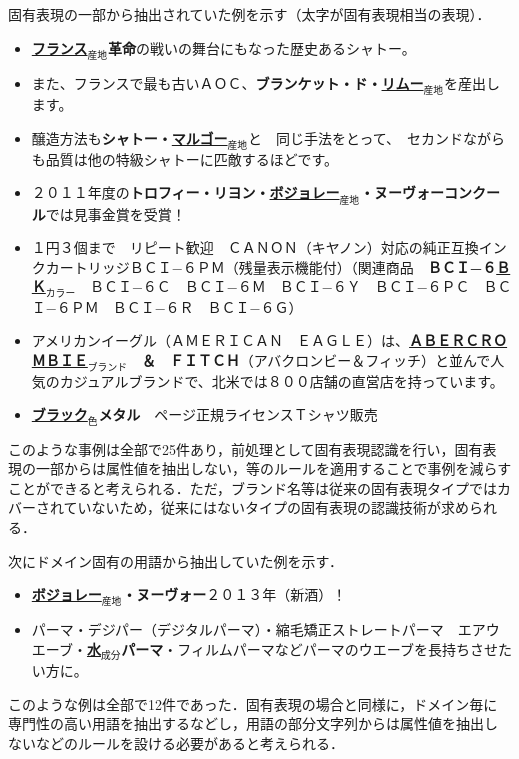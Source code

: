 \documentclass[japanese]{jnlp_1.4}
\begin{document}
固有表現の一部から抽出されていた例を示す（太字が固有表現相当の表現）．

\begin{itemize}
\item {\bf \underline{フランス}$_{産地}$革命}の戦いの舞台にもなった歴史あるシャトー。
\item また、フランスで最も古いＡＯＣ、{\bf ブランケット・ド・\underline{リムー}}$_{産地}$を産出します。
\item 醸造方法も{\bf シャトー・\underline{マルゴー}$_{産地}$}と　同じ手法をとって、　セカンドながらも品質は他の特級シャトーに匹敵するほどです。
\item ２０１１年度の{\bf トロフィー・リヨン・\underline{ボジョレー}$_{産地}$・ヌーヴォーコンクール}では見事金賞を受賞！
\item １円３個まで　リピート歓迎　ＣＡＮＯＮ（キヤノン）対応の純正互換インクカートリッジＢＣＩ−６ＰＭ（残量表示機能付）（関連商品　{\bf ＢＣＩ−６\underline{ＢＫ}$_{カラー}$}　ＢＣＩ−６Ｃ　ＢＣＩ−６Ｍ　ＢＣＩ−６Ｙ　ＢＣＩ−６ＰＣ　ＢＣＩ−６ＰＭ　ＢＣＩ−６Ｒ　ＢＣＩ−６Ｇ）
\item アメリカンイーグル（ＡＭＥＲＩＣＡＮ　ＥＡＧＬＥ）は、{\bf \underline{ＡＢＥＲＣＲＯＭＢＩＥ}$_{ブランド}$　＆　ＦＩＴＣＨ}（アバクロンビー＆フィッチ）と並んで人気のカジュアルブランドで、北米では８００店舗の直営店を持っています。
\item {\bf \underline{ブラック}$_{色}$メタル}　ページ正規ライセンスＴシャツ販売
\end{itemize}

\noindent
このような事例は全部で25件あり，前処理として固有表現認識を行い，固有表
現の一部からは属性値を抽出しない，等のルールを適用することで事例を減らすことができると考えられる．ただ，ブランド名等は従来の固有表現タイプではカバーされていないため，従来にはないタイプの固有表現の認識技術が求められる．

次にドメイン固有の用語から抽出していた例を示す．

\begin{itemize}
\item {\bf \underline{ボジョレー}$_{産地}$・ヌーヴォー}２０１３年（新酒）！
\item パーマ・デジパー（デジタルパーマ）・縮毛矯正ストレートパーマ　エアウエーブ・{\bf \underline{水}$_{成分}$パーマ}・フィルムパーマなどパーマのウエーブを長持ちさせたい方に。
\end{itemize}

\noindent
このような例は全部で12件であった．固有表現の場合と同様に，ドメイン毎に
専門性の高い用語を抽出するなどし，用語の部分文字列からは属性値を抽出し
ないなどのルールを設ける必要があると考えられる．
\end{document}

